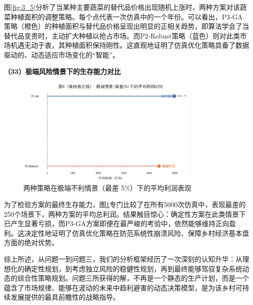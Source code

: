 \documentclass[withoutpreface,bwprint]{cumcmthesis} %
\begin{document}
图\ref{fig:3_5}分析了当某种主要蔬菜的替代品价格出现随机上涨时，两种方案对该蔬菜种植面积的调整策略。每个点代表一次仿真中的一个年份。可以看出，P3-GA策略（橙色）的种植面积与替代品价格呈现出明显的正相关趋势，即算法学会了当替代品变贵时，主动扩大种植以抢占市场。而P2-Robust策略（蓝色）则对此类市场机遇无动于衷，其种植面积保持刚性。这直观地证明了仿真优化策略具备了数据驱动的、动态适应市场变化的“智能”。

\textbf{（33）极端风险情景下的生存能力对比}

\begin{figure}[htbp]
    \centering
    \includegraphics[width=0.8\textwidth]{figures/3_6.png}
    \caption{两种策略在极端不利情景（最差 5\%）下的平均利润表现}
    \label{fig:3_6}
\end{figure}

为了检验方案的最终生存能力，图\ref{fig:3_6}专门比较了在所有5000次仿真中，表现最差的250个场景下，两种方案的平均总利润。结果触目惊心：确定性方案在此类情景下已产生显著亏损，而P3-GA方案即便在最严峻的考验中，依然能够维持正向盈利。这决定性地证明了仿真优化策略在防范系统性崩溃风险、保障乡村经济基本盘方面的绝对优势。

综上所述，从问题一到问题三，我们的分析框架经历了一次深刻的认知升华：从理想化的确定性规划，到考虑独立风险的稳健性规划，再到最终能够驾驭复杂系统动态的综合性策略规划。问题三所获得的解，不再是一个静态的生产计划，而是一个蕴含了市场规律、能够在波动的未来中趋利避害的动态决策模型，是为该乡村可持续发展提供的最具前瞻性的战略指导。

\newpage



\newpage

\end{document}
